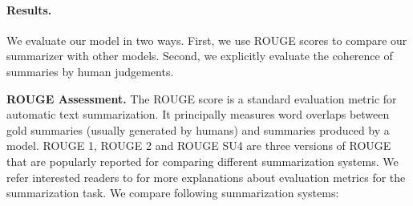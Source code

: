 




\paragraph{Results. }
We evaluate our model in two ways. 
First, we use ROUGE scores to compare our summarizer with other models. 
Second, we explicitly evaluate the coherence of summaries by human judgements.

\textbf{ROUGE Assessment. }
The ROUGE score \cite{linchinyew04} is a standard evaluation metric for automatic text summarization. 
It principally measures word overlaps between gold summaries (usually generated by humans) and summaries produced by a model. 
ROUGE 1, ROUGE 2 and ROUGE SU4 are three versions of ROUGE that are popularly reported for comparing different summarization systems.  
We refer interested readers to   for more explanations about evaluation metrics for the summarization task. 
We compare following summarization systems: 

